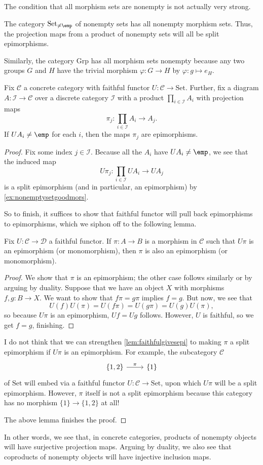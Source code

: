 The condition that all morphism sets are nonempty is not actually very strong.
\begin{example} \label{ex:nonemptysetgoodmors}
	The category $\mathrm{Set}_{\ne\emp}$ of nonempty sets has all nonempty morphism sets. Thus, the projection maps from a product of nonempty sets will all be split epimorphisms.
\end{example}
\begin{ex}
	Similarly, the category $\mathrm{Grp}$ has all morphism sets nonempty because any two groups $G$ and $H$ have the trivial morphism $\varphi:G\to H$ by $\varphi:g\mapsto e_H$.
\end{ex}
\begin{corollary}
	Fix $\mathcal C$ a concrete category with faithful functor $U:\mathcal C\to\mathrm{Set}$. Further, fix a diagram $A:\mathcal I\to\mathcal C$ over a discrete category $\mathcal I$ with a product $\prod_{i\in\mathcal I}A_i$ with projection maps
	\[\pi_j:\prod_{i\in\mathcal I}A_i\to A_j.\]
	If $UA_i\ne\emp$ for each $i$, then the maps $\pi_j$ are epimorphisms.
\end{corollary}
\begin{proof}
	Fix some index $j\in\mathcal I$. Because all the $A_i$ have $UA_i\ne\emp$, we see that the induced map
	\[U\pi_j:\prod_{i\in\mathcal I}UA_i\to UA_j\]
	is a split epimorphism (and in particular, an epimorphism) by \autoref{ex:nonemptysetgoodmors}.

	So to finish, it suffices to show that faithful functor will pull back epimorphisms to epimorphisms, which we siphon off to the following lemma.
	\begin{lemma} \label{lem:faithfulgivesepi}
		Fix $U:\mathcal C\to\mathcal D$ a faithful functor. If $\pi:A\to B$ is a morphism in $\mathcal C$ such that $U\pi$ is an epimorphism (or monomorphism), then $\pi$ is also an epimorphism (or monomorphism).
	\end{lemma}
	\begin{proof}
		We show that $\pi$ is an epimorphism; the other case follows similarly or by arguing by duality. Suppose that we have an object $X$ with morphisms $f,g:B\to X$. We want to show that $f\pi=g\pi$ implies $f=g$. But now, we see that
		\[U(f)U(\pi)=U(f\pi)=U(g\pi)=U(g)U(\pi),\]
		so because $U\pi$ is an epimorphism, $Uf=Ug$ follows. However, $U$ is faithful, so we get $f=g$, finishing.
	\end{proof}
	\begin{remark}[Nir]
		I do not think that we can strengthen \autoref{lem:faithfulgivesepi} to making $\pi$ a split epimorphism if $U\pi$ is an epimorphism. For example, the subcategory $\mathcal C$
		\[\begin{tikzcd}
			{\{1,2\}} & {\{1\}}
			\arrow["\pi", from=1-1, to=1-2]
		\end{tikzcd}\]
		of $\mathrm{Set}$ will embed via a faithful functor $U:\mathcal C\to\mathrm{Set}$, upon which $U\pi$ will be a split epimorphism. However, $\pi$ itself is not a split epimorphism because this category has no morphism $\{1\}\to\{1,2\}$ at all!
	\end{remark}
	The above lemma finishes the proof.
\end{proof}
In other words, we see that, in concrete categories, products of nonempty objects will have surjective projection maps. Arguing by duality, we also see that coproducts of nonempty objects will have injective inclusion maps.